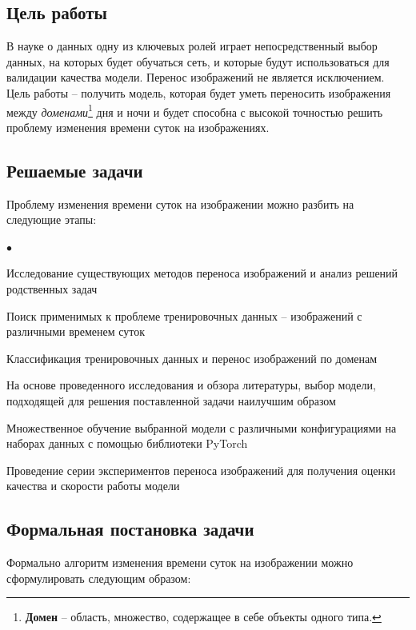 \documentclass[11pt,a4paper]{extarticle}
\newenvironment{compactlist}{
\begin{list}{{$\bullet$}}{
\setlength\partopsep{0pt}
\setlength\parskip{0pt}
\setlength\parsep{0pt}
\setlength\topsep{0pt}
\setlength\itemsep{0pt}
}}{
\end{list}
}
\begin{document}
	\subsection{Цель работы}

		В науке о данных одну из ключевых ролей играет непосредственный выбор данных, на которых будет обучаться сеть, 
		и которые будут использоваться для валидации качества модели. Перенос изображений не является исключением.
		Цель работы -- получить модель, которая будет уметь переносить изображения между \textit{доменами}\footnote{
			\textbf{Домен} -- область, множество, содержащее в себе объекты одного типа. 
		} дня и ночи и будет способна с высокой точностью решить проблему изменения времени суток на изображениях.


	\subsection{Решаемые задачи}

		Проблему изменения времени суток на изображении можно разбить на следующие этапы:

		\begin{compactlist}
			\item Исследование существующих методов переноса изображений и анализ решений родственных задач
			\item Поиск применимых к проблеме тренировочных данных -- изображений с различными временем суток
			\item Классификация тренировочных данных и перенос изображений по доменам 
			\item На основе проведенного исследования и обзора литературы, выбор модели, подходящей для решения поставленной задачи
			наилучшим образом
			\item Множественное обучение выбранной модели с различными конфигурациями на наборах данных с помощью библиотеки PyTorch
			\item Проведение серии экспериментов переноса изображений для получения оценки качества и скорости работы модели 
		\end{compactlist}


	\subsection{Формальная постановка задачи}\label{intro_problem}

		Формально алгоритм изменения времени суток на изображении можно сформулировать следующим образом:
		\vspace{-1em}
\end{document}
